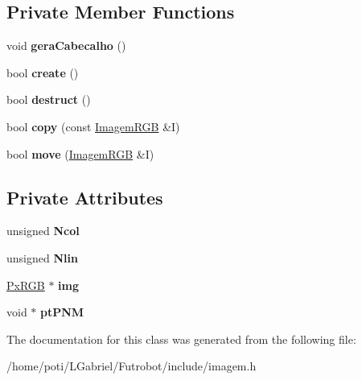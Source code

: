 \subsection*{Private Member Functions}
\begin{DoxyCompactItemize}
\item 
void {\bfseries gera\+Cabecalho} ()\hypertarget{classImagemRGB_a8f4265f73ac99ef5f759d504899630b2}{}\label{classImagemRGB_a8f4265f73ac99ef5f759d504899630b2}

\item 
bool {\bfseries create} ()\hypertarget{classImagemRGB_ac9e071a210dc2e3e4bc93d40a6e8edae}{}\label{classImagemRGB_ac9e071a210dc2e3e4bc93d40a6e8edae}

\item 
bool {\bfseries destruct} ()\hypertarget{classImagemRGB_ac9c4605ff5f1f615b3581b21722b5595}{}\label{classImagemRGB_ac9c4605ff5f1f615b3581b21722b5595}

\item 
bool {\bfseries copy} (const \hyperlink{classImagemRGB}{Imagem\+R\+GB} \&I)\hypertarget{classImagemRGB_a40aa8ce21bd204d896e02517fd68bbed}{}\label{classImagemRGB_a40aa8ce21bd204d896e02517fd68bbed}

\item 
bool {\bfseries move} (\hyperlink{classImagemRGB}{Imagem\+R\+GB} \&I)\hypertarget{classImagemRGB_ab27546361f63ddc6f07a072d16c1ee57}{}\label{classImagemRGB_ab27546361f63ddc6f07a072d16c1ee57}

\end{DoxyCompactItemize}
\subsection*{Private Attributes}
\begin{DoxyCompactItemize}
\item 
unsigned {\bfseries Ncol}\hypertarget{classImagemRGB_a7c9928c475c04841333b6c7c131be5f7}{}\label{classImagemRGB_a7c9928c475c04841333b6c7c131be5f7}

\item 
unsigned {\bfseries Nlin}\hypertarget{classImagemRGB_a62f1f697d7c30b6e934f1d3f0beb6ae3}{}\label{classImagemRGB_a62f1f697d7c30b6e934f1d3f0beb6ae3}

\item 
\hyperlink{classPxRGB}{Px\+R\+GB} $\ast$ {\bfseries img}\hypertarget{classImagemRGB_a9c51a4dc123154fba62c5b8b0a9d7a19}{}\label{classImagemRGB_a9c51a4dc123154fba62c5b8b0a9d7a19}

\item 
void $\ast$ {\bfseries pt\+P\+NM}\hypertarget{classImagemRGB_aa3bd6bf3c0b220a68e621c35c727d79f}{}\label{classImagemRGB_aa3bd6bf3c0b220a68e621c35c727d79f}

\end{DoxyCompactItemize}


The documentation for this class was generated from the following file\+:\begin{DoxyCompactItemize}
\item 
/home/poti/\+L\+Gabriel/\+Futrobot/include/imagem.\+h\end{DoxyCompactItemize}
